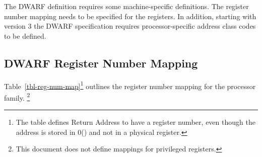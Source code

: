 The DWARF definition requires some machine-specific definitions.
The register number mapping needs to be specified for the \xARCH
registers. In addition, starting with version 3 the DWARF specification
requires processor-specific address class codes to be defined.

\subsection{DWARF Register Number Mapping}

Table~\ref{tbl-reg-num-map}\footnote{The table defines Return Address
  to have a register number, even though the address is stored in
  0(\RSP) and not in a physical register.}  outlines the register
number mapping for the \xARCH processor family.%
\footnote{This document does not define mappings for privileged registers.}%

